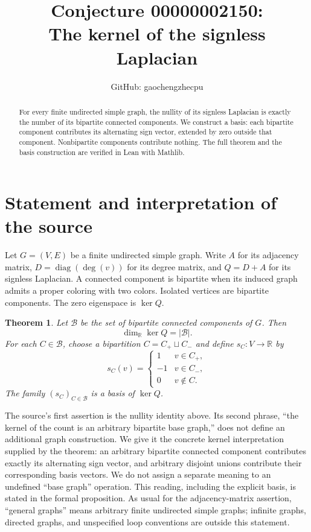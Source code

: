 \documentclass[11pt]{article}
\title{Conjecture 00000002150:\\The kernel of the signless Laplacian}
\author{GitHub: gaochengzhecpu}
\date{}
\newtheorem{theorem}{Theorem}
\begin{document}
\maketitle

\begin{abstract}
For every finite undirected simple graph, the nullity of its signless
Laplacian is exactly the number of its bipartite connected components.
We construct a basis: each bipartite component contributes its alternating
sign vector, extended by zero outside that component. Nonbipartite
components contribute nothing. The full theorem and the basis construction
are verified in Lean with Mathlib.
\end{abstract}

\section{Statement and interpretation of the source}
Let $G=(V,E)$ be a finite undirected simple graph. Write $A$ for its
adjacency matrix, $D=\operatorname{diag}(\deg(v))$ for its degree matrix,
and $Q=D+A$ for its signless Laplacian. A connected component is bipartite
when its induced graph admits a proper coloring with two colors. Isolated
vertices are bipartite components. The zero eigenspace is $\ker Q$.

\begin{theorem}\label{thm:main}
Let $\mathcal B$ be the set of bipartite connected components of $G$.
Then
\[
\dim_{\mathbb R}\ker Q=|\mathcal B|.
\]
For each $C\in\mathcal B$, choose a bipartition
$C=C_+\sqcup C_-$ and define $s_C:V\to\mathbb R$ by
\[
s_C(v)=
\begin{cases}
1&v\in C_+,\\
-1&v\in C_-,\\
0&v\notin C.
\end{cases}
\]
The family $(s_C)_{C\in\mathcal B}$ is a basis of $\ker Q$.
\end{theorem}

The source's first assertion is the nullity identity above. Its second
phrase, ``the kernel of the count is an arbitrary bipartite base graph,''
does not define an additional graph construction. We give it the concrete
kernel interpretation supplied by the theorem: an arbitrary bipartite
connected component contributes exactly its alternating sign vector,
and arbitrary disjoint unions contribute their corresponding basis
vectors. We do not assign a separate meaning to an undefined ``base
graph'' operation. This reading, including the explicit basis, is stated
in the formal proposition. As usual for the adjacency-matrix assertion,
``general graphs'' means arbitrary finite undirected simple graphs;
infinite graphs, directed graphs, and unspecified loop conventions are
outside this statement.
\end{document}
